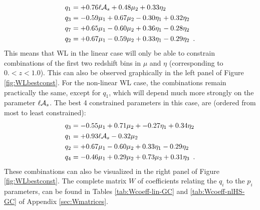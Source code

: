 \begin{equation} \label{eq:bestCombined-WLlin}
\begin{aligned}
	q_1  &= +0.76\ell \mathcal{A}_{s} + 0.48 \mu_2 + 0.33\eta_2 \\
	q_3  &= -0.59\mu_1 + 0.67 \mu_2 - 0.30\eta_1 + 0.32 \eta_2\\
	q_7  &= +0.65\mu_1 - 0.60 \mu_2 + 0.36\eta_1 - 0.28 \eta_2\\
	q_2  &= +0.67\mu_1 - 0.59 \mu_2 + 0.33\eta_1 - 0.29 \eta_2 \,\,\, .
\end{aligned}
\end{equation}
This means that WL in the linear case will only be able to constrain 
combinations of the first two redshift bins in $\mu$ and $\eta$ (corresponding to  $ 0. < z < 1.0 $).
This can also be observed graphically in the left panel of Figure \ref{fig:WLbestconst}.
For the non-linear WL case, the combinations remain practically the same, except for $q_1$, which will depend much more strongly on the parameter $\ell \mathcal{A}_{s}$. The best 4 constrained parameters in this case, are (ordered from most to least constrained):
\begin{equation} \label{eq:bestCombined-WLnonlin}
\begin{aligned}
	q_3  &= -0.55\mu_1 + 0.71 \mu_2 + -0.27\eta_1 + 0.34\eta_2\\            
	q_1  &= +0.93\ell \mathcal{A}_{s} - 0.32\mu_2 \\ 
	q_2  &= +0.67\mu_1 - 0.60 \mu_2 + 0.33\eta_1 - 0.29 \eta_2\\
	q_4  &= -0.46\mu_1 + 0.29 \mu_2 + 0.73\mu_3 + 0.31 \eta_3 \,\,\, .
\end{aligned}
\end{equation}
These combinations can also be visualized in the right panel of Figure \ref{fig:WLbestconst}.
The complete matrix $W$ of coefficients relating the $q_i$ to the $p_i$ parameters, can be found in Tables \ref{tab:Wcoeff-lin-GC} and \ref{tab:Wcoeff-nlHS-GC} of Appendix \ref{sec:Wmatrices}.

